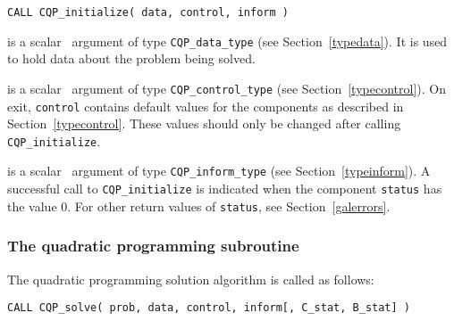 \documentclass{galahad}
\newcommand{\packagename}{CQP}
\begin{document}
\hspace{8mm}
{\tt CALL \packagename\_initialize( data, control, inform )}

\vspace*{-3mm}
\begin{description}

 is a scalar \intentinout\ argument of type
{\tt \packagename\_data\_type}
(see Section~\ref{typedata}). It is used to hold data about the problem being
solved.

 is a scalar \intentout\ argument of type
{\tt \packagename\_control\_type}
(see Section~\ref{typecontrol}).
On exit, {\tt control} contains default values for the components as
described in Section~\ref{typecontrol}.
These values should only be changed after calling
{\tt \packagename\_initialize}.

 is a scalar \intentout\ argument of type
{\tt \packagename\_inform\_type}
(see Section~\ref{typeinform}). A successful call to
{\tt \packagename\_initialize}
is indicated when the  component {\tt status} has the value 0.
For other return values of {\tt status}, see Section~\ref{galerrors}.

\end{description}


\subsubsection{The quadratic programming subroutine}\label{qps}
The quadratic programming solution algorithm is called as follows:
\vspace*{1mm}

\hspace{8mm}
{\tt CALL \packagename\_solve( prob, data, control, inform[, C\_stat, B\_stat] )}
\end{document}
